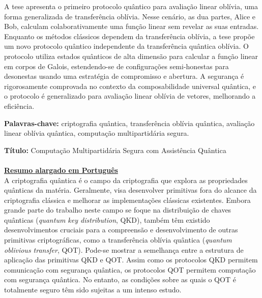 \documentclass[12pt]{report}
\begin{document}
A tese apresenta o primeiro protocolo quântico para avaliação linear oblívia, uma forma generalizada de transferência oblívia. Nesse cenário, as dua partes, Alice e Bob, calculam colaborativamente uma função linear sem revelar as suas entradas. Enquanto os métodos clássicos dependem da transferência oblívia, a tese propõe um novo protocolo quântico independente da transferência quântica oblívia. O protocolo utiliza estados quânticos de alta dimensão para calcular a função linear em corpos de Galois, estendendo-se de configurações semi-honestas para desonestas usando uma estratégia de compromisso e abertura. A segurança é rigorosamente comprovada no contexto da composabilidade universal quântica, e o protocolo é generalizado para avaliação linear oblívia de vetores, melhorando a eficiência.

\vfill
\begin{flushleft}
\textbf{Palavras-chave:} criptografia qu\^{a}ntica, transferência oblívia quântica, avaliação linear oblívia quântica, computação multipartidária segura.
\end{flushleft}


\newpage


\noindent\textbf{T\'itulo:} Computa\c{c}\~{a}o Multipartid\'{a}ria Segura com Assist\^{e}ncia Qu\^{a}ntica\\\\

\noindent\underline{\textbf{Resumo alargado em Portugu\^{e}s}}\\

A criptografia quântica é o campo da criptografia que explora as propriedades quânticas da matéria. Geralmente, visa desenvolver primitivas fora do alcance da criptografia clássica e melhorar as implementações clássicas existentes. Embora grande parte do trabalho neste campo se foque na distribuição de chaves quânticas (\textit{quantum key distribution}, QKD), também têm existido desenvolvimentos cruciais para a compreensão e desenvolvimento de outras primitivas criptográficas, como a transferência oblívia quântica (\textit{quantum oblivious transfer}, QOT). Pode-se mostrar a semelhança entre a estrutura de aplicação das primitivas QKD e QOT. Assim como os protocolos QKD permitem comunicação com segurança quântica, os protocolos QOT permitem computação com segurança quântica. No entanto, as condições sobre as quais o QOT é totalmente seguro têm sido sujeitas a um intenso estudo. 
\end{document}
